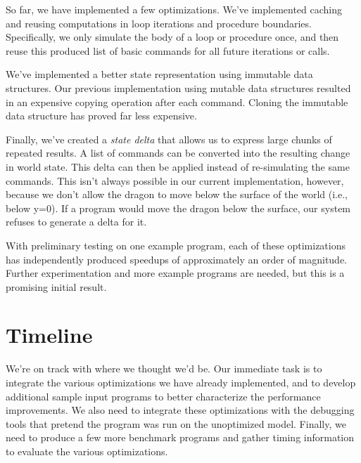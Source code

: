 \documentclass{sig-alternate}
\begin{document}
So far, we have implemented a few optimizations. We've implemented caching and reusing computations in loop iterations and procedure boundaries. Specifically, we only simulate the body of a loop or procedure once, and then reuse this produced list of basic commands for all future iterations or calls.  

We've implemented a better state representation using immutable data structures. Our previous implementation using mutable data structures resulted in an expensive copying operation after each command. Cloning the immutable data structure has proved far less expensive.

Finally, we've created a \emph{state delta} that allows us to express large chunks of repeated results. A list of commands can be converted into the resulting change in world state. This delta can then be applied instead of re-simulating the same commands. This isn't always possible in our current implementation, however, because we don't allow the dragon to move below the surface of the world (i.e., below y=0). If a program would move the dragon below the surface, our system refuses to generate a delta for it.

With preliminary testing on one example program, each of these optimizations has independently produced speedups of approximately an order of magnitude. Further experimentation and more example programs are needed, but this is a promising initial result.

\section*{Timeline}
We're on track with where we thought we'd be. Our immediate task is to integrate the various optimizations we have already implemented, and to develop additional sample input programs to better characterize the performance improvements. We also need to integrate these optimizations with the debugging tools that pretend the program was run on the unoptimized model. Finally, we need to produce a few more benchmark programs and gather timing information to evaluate the various optimizations.



\end{document}
